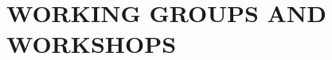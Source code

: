 \documentclass[11pt,english]{article}\usepackage[]{graphicx}\usepackage[]{xcolor}
\begin{document}

\vspace{-2ex}
\section*{WORKING GROUPS AND WORKSHOPS} %
\vspace{-0.5ex}
\end{document}
